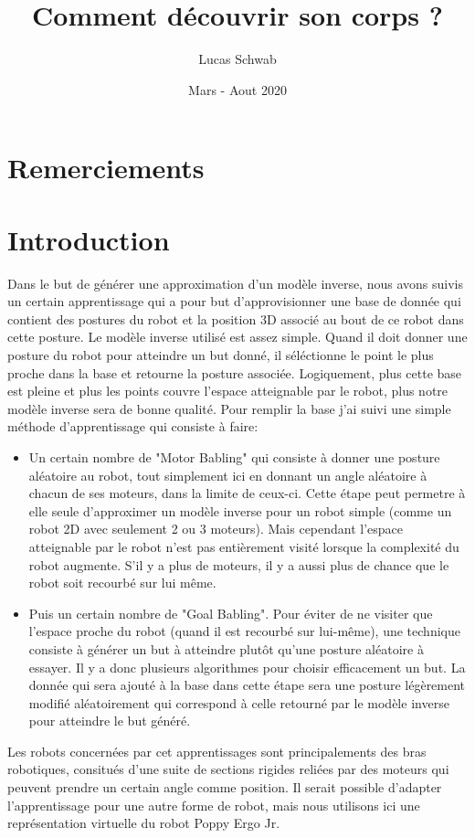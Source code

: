\documentclass{article}
\title{Comment découvrir son corps ?}
\author{Lucas Schwab}
\date{Mars - Aout 2020}
\begin{document}
\maketitle

\tableofcontents

\section*{Remerciements}

\section*{Introduction}

Dans le but de générer une approximation d'un modèle inverse, nous avons suivis un certain apprentissage qui a pour but d'approvisionner une base de donnée qui contient des postures du robot et la position 3D associé au bout de ce robot dans cette posture. Le modèle inverse utilisé est assez simple. Quand il doit donner une posture du robot pour atteindre un but donné, il séléctionne le point le plus proche dans la base et retourne la posture associée. Logiquement, plus cette base est pleine et plus les points couvre l'espace atteignable par le robot, plus notre modèle inverse sera de bonne qualité. Pour remplir la base j'ai suivi une simple méthode d'apprentissage qui consiste à faire:
\begin{itemize}
    \item Un certain nombre de "Motor Babling" qui consiste à donner une posture aléatoire au robot, tout simplement ici en donnant un angle aléatoire à chacun de ses moteurs, dans la limite de ceux-ci. Cette étape peut permetre à elle seule d'approximer un modèle inverse pour un robot simple (comme un robot 2D avec seulement 2 ou 3 moteurs). Mais cependant l'espace atteignable par le robot n'est pas entièrement visité lorsque la complexité du robot augmente. S'il y a plus de moteurs, il y a aussi plus de chance que le robot soit recourbé sur lui même.
    \item Puis un certain nombre de "Goal Babling". Pour éviter de ne visiter que l'espace proche du robot (quand il est recourbé sur lui-même), une technique consiste à générer un but à atteindre plutôt qu'une posture aléatoire à essayer. Il y a donc plusieurs algorithmes pour choisir efficacement un but. La donnée qui sera ajouté à la base dans cette étape sera une posture légèrement modifié aléatoirement qui correspond à celle retourné par le modèle inverse pour atteindre le but généré.
\end{itemize}
Les robots concernées par cet apprentissages sont principalements des bras robotiques, consitués d'une suite de sections rigides reliées par des moteurs qui peuvent prendre un certain angle comme position. Il serait possible d'adapter l'apprentissage pour une autre forme de robot, mais nous utilisons ici une représentation virtuelle du robot Poppy Ergo Jr.
\end{document}
